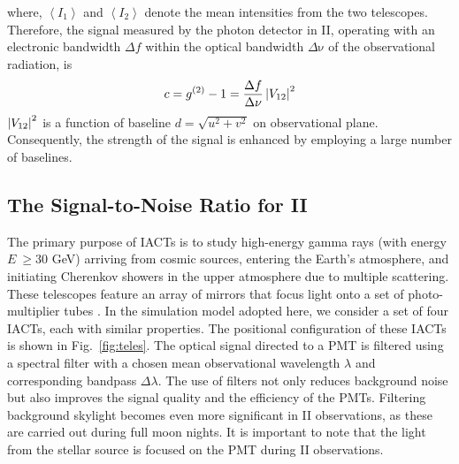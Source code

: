 where, $\left\langle I_1 \right\rangle$ and $\left\langle I_2 \right\rangle$ denote the mean intensities from the two telescopes. Therefore, the signal measured by the photon detector in II, operating with an electronic bandwidth $\Delta f$ within the optical bandwidth $\Delta {\mathrm {\nu}}$ of the observational radiation, is
\begin{equation}
	c = g^{(2)} - 1 = \frac{\Delta f}{\Delta \nu} \abs{V_{12}}^2
	\label{eq:signal}
\end{equation}
$\left|V_{12}\right|^2$ is a function of baseline $d = \sqrt{u^2 + v^2}$ on observational plane. Consequently, the strength of the signal is enhanced by employing a large number of baselines.

\subsection{The Signal-to-Noise Ratio for II}
The primary purpose of IACTs is to study high-energy gamma rays (with energy $E\ \geq 30$ GeV) arriving from cosmic sources, entering the Earth's atmosphere, and initiating Cherenkov showers in the upper atmosphere due to multiple scattering. These telescopes feature an array of mirrors that focus light onto a set of photo-multiplier tubes \citep[PMTs, see e.g.,][]{aleksic2016major}. In the simulation model adopted here, we consider a set of four IACTs, each with similar properties. The positional configuration of these IACTs is shown in Fig.~\ref{fig:teles}. The optical signal directed to a PMT is filtered using a spectral filter with a chosen mean observational wavelength $\lambda$ and corresponding bandpass $\Delta \lambda$. The use of filters not only reduces background noise but also improves the signal quality and the efficiency of the PMTs. Filtering background skylight becomes even more significant in II observations, as these are carried out during full moon nights. It is important to note that the light from the stellar source is focused on the PMT during II observations.

